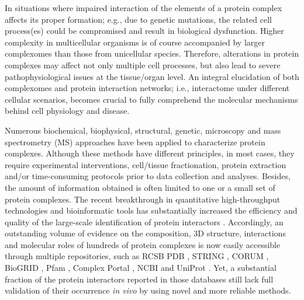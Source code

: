 In situations where impaired interaction of the elements of a protein complex affects its proper formation; e.g., due to genetic mutations, the related cell process(es) could be compromised and result in biological dysfunction. Higher complexity in multicellular organisms is of course accompanied by larger complexomes than those from unicellular species. Therefore, alterations in protein complexes may affect not only multiple cell processes, but also lead to severe pathophysiological issues at the tissue/organ level. An integral elucidation of both complexomes and protein interaction networks; i.e., interactome \cite{Vidal_2011} under different cellular scenarios, becomes crucial to fully comprehend the molecular mechanisms behind cell physiology and disease.

Numerous biochemical, biophysical, structural, genetic, microscopy and mass spectrometry (MS) approaches have been applied to characterize protein complexes. Although these methods have different principles, in most cases, they require experimental interventions, cell/tissue fractionation, protein extraction and/or time-consuming protocols prior to data collection and analyses. Besides, the amount of information obtained is often limited to one or a small set of protein complexes. The recent breakthrough in quantitative high-throughput technologies and bioinformatic tools has substantially increased the efficiency and quality of the large-scale identification of protein interactors \cite{Iacobucci_2021, Low_2021}. Accordingly, an outstanding volume of evidence on the composition, 3D structure, interactions and molecular roles of hundreds of protein complexes is now easily accessible through multiple repositories, such as RCSB PDB \cite{Burley_2021}, STRING \cite{Szklarczyk_2021}, CORUM \cite{Giurgiu_2019}, BioGRID \cite{Oughtred_2021}, Pfam \cite{Mistry_2021}, Complex Portal \cite{Meldal_2021}, NCBI \cite{Coordinators_2016} and UniProt \cite{UniProt_2021}. Yet, a substantial fraction of the protein interactors reported in those databases still lack full validation of their occurrence \emph{in vivo} by using novel and more reliable methods.

